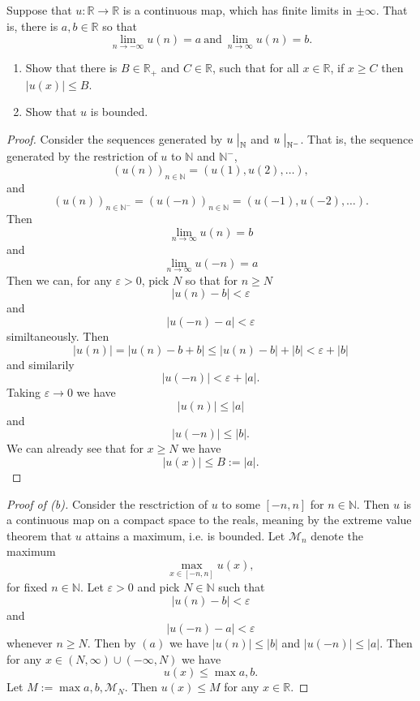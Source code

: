 \begin{prob}
    Suppose that $u : \mathbb R \to \mathbb R$ is a continuous 
    map, which has finite limits in $\pm \infty$. That is, 
    there is $a,b\in \mathbb R$ so that 
    \[
        \lim_{n\to-\infty}u(n) = a \ \text{and} \ 
        \lim_{n\to\infty}u(n) = b.
    \]

    \begin{enumerate}[label=\alph*)]
        \item Show that there is $B \in \mathbb R_+$ and 
        $C \in \mathbb R$, such that for all $x \in \mathbb R$, 
        if $x \geq C$ then $|u(x)|\leq B$.
        \item Show that $u$ is bounded.
    \end{enumerate}
\end{prob}
\begin{proof}
    Consider the sequences generated by $u\bigm|_{\mathbb N}$ 
    and $u\bigm|_{\mathbb N^-}$. 
    That is, the sequence generated by the restriction of 
    $u$ to $\mathbb N$ and $\mathbb N^-$, 
    \[
        (u(n))_{n\in\mathbb N} = (u(1), u(2),\ldots),
    \]
    and 
    \[
        (u(n))_{n\in\mathbb N^-} = (u(-n))_{n\in\mathbb N} 
        = (u(-1), u(-2), \ldots).
    \]
    Then 
    \[
        \lim_{n\to\infty} u(n) = b
    \]
    and 
    \[
        \lim_{n\to\infty}u(-n) = a
    \]
    Then we can, for any $\varepsilon > 0$, 
    pick $N$ so that for $n \geq N$ 
    \[
        |u(n) - b| < \varepsilon
    \]
    and 
    \[
        |u(-n) - a| < \varepsilon
    \]
    similtaneously.
    Then 
    \[
        |u(n)| = 
        |u(n) - b + b| \leq |u(n) - b| + |b| < \varepsilon + |b|
    \]
    and similarily 
    \[
        |u(-n)| < \varepsilon + |a|. 
    \]
    Taking $\varepsilon \to 0$ we have 
    \[
        |u(n)| \leq |a|
    \]
    and 
    \[
        |u(-n)| \leq |b|.
    \]
    We can already see that for $x \geq N$ we have 
    \[
        |u(x)| \leq B := |a|.
    \]

\end{proof}

\begin{proof}[Proof of (b)]
    Consider the resctriction of $u$ to some $[-n, n]$ for 
    $n \in \mathbb N$. Then $u$ is a continuous map on 
    a compact space to the reals, meaning by the 
    extreme value theorem that $u$ attains a maximum, i.e. 
    is bounded. Let $\mathcal M_n$ denote the maximum 
    \[
        \max_{x \in [-n,n]}u(x),
    \]
    for fixed $n \in \mathbb N$.
    Let $\varepsilon > 0$ and pick $N \in \mathbb N$ such that 
    \[
        |u(n) - b| < \varepsilon
    \]
    and 
    \[
        |u(-n) - a| < \varepsilon
    \]
    whenever $n \geq N$. Then by $(a)$ we have 
    $|u(n)| \leq |b|$ and $|u(-n)| \leq |a|$. Then for any 
    $x \in (N, \infty) \cup (-\infty, N)$ we have 
    \[
        u(x) \leq \max{a,b}.
    \]
    Let $M := \max{a,b, \mathcal M_N}$. Then 
    $u(x) \leq M$ for any $x \in \mathbb R$.
\end{proof}

